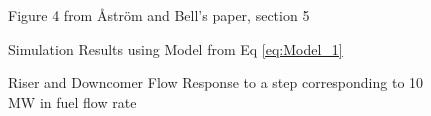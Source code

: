         \begin{figure}[ht]
            \begin{center}
                
                Figure 4 from \r{A}str\"{o}m and Bell's paper, section 5 \cite{Astrom}    
                
                
                Simulation Results using Model from Eq \eqref{eq:Model_1}
                
                \caption{Riser and Downcomer Flow Response to a step corresponding to 10 MW in fuel flow rate}
                \label{fig:Fig4C}
            \end{center}
        \end{figure}
